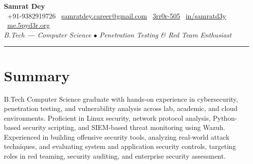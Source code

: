 \documentclass[11pt,a4paper]{article}
\makeatletter
\newcommand{\name}{Samrat Dey}
\newcommand{\phone}{9382919726}
\newcommand{\emaila}{samratdey.career@gmail.com}
\newcommand{\github}{3rr0r-505}
\newcommand{\linkedin}{samratd3y}
\newcommand{\portfolio}{me.5pyd3r.org}
\makeatother
\begin{document}

{
  \centering
  {\LARGE\bfseries \name} \\[4pt]
  \small
  \textcolor{accent}{\faPhone}\ +91-\phone \hspace{4pt}
  \textcolor{accent}{\faEnvelope}\ \href{mailto:\emaila}{\emaila} \hspace{4pt}
  \textcolor{accent}{\faGithub}\ \href{https://github.com/\github}{\github} \hspace{4pt}
  \textcolor{accent}{\faLinkedin}\ \href{https://www.linkedin.com/in/\linkedin/}{in/\linkedin} \hspace{4pt}
  \textcolor{accent}{\faGlobe}\ \href{https://\portfolio}{\portfolio} \\[4pt]
  \textit{\small B.Tech {\large\textbf{---}} Computer Science \hspace{4pt}$\bullet$\hspace{4pt} Penetration Testing \& Red Team Enthusiast}\\[2pt]
  \par
}

\vspace{1mm}
\noindent\textcolor{rulegray}{\rule{\linewidth}{0.4pt}}
\vspace{-3mm}

\section{Summary}
\justify\small
B.Tech Computer Science graduate with hands-on experience in cybersecurity, penetration testing, and vulnerability analysis across lab, academic, and cloud environments. Proficient in Linux security, network protocol analysis, Python-based security scripting, and SIEM-based threat monitoring using Wazuh. Experienced in building offensive security tools, analyzing real-world attack techniques, and evaluating system and application security controls, targeting roles in red teaming, security auditing, and enterprise security assessment.
\end{document}
